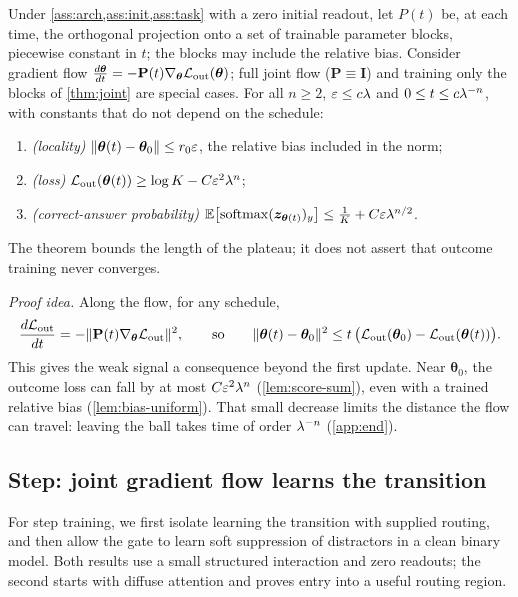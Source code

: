 \begin{theorem}
\label{thm:outcome-end}
Under \cref{ass:arch,ass:init,ass:task} with a zero initial readout, let $P(t)$ be, at each time, the orthogonal projection onto a set
of trainable parameter blocks, piecewise constant in $t$; the blocks may include the relative bias. Consider gradient flow
$\tfrac{d\bm\theta}{dt}=-\mathbf P(t)\nabla_{\bm\theta}\Lout(\bm\theta)$; full joint flow ($\mathbf P\equiv\mathbf I$) and training only the blocks of \cref{thm:joint} are special cases.
For all $n\ge2$, $\varepsilon\le c\lambda$ and $0\le t\le c\lambda^{-n}$, with constants that do not depend on the schedule:
\begin{enumerate}[label=(\roman*),leftmargin=*,itemsep=0pt,topsep=2pt]
\item \emph{(locality)} $\|\bm\theta(t)-\bm\theta_0\|\le r_0\varepsilon$, the relative bias included in the norm;
\item \emph{(loss)} $\mathcal L_{\mathrm{out}}(\bm\theta(t))\ge\log K-C\varepsilon^2\lambda^n$;
\item \emph{(correct-answer probability)} $\mathbb E\bigl[\operatorname{softmax}(\bm z_{\bm\theta(t)})_y\bigr]\le\frac{1}{K}+C\varepsilon\lambda^{n/2}$.
\end{enumerate}
\end{theorem}
The theorem bounds the length of the plateau; it does not assert that outcome training never converges.

\emph{Proof idea.} Along the flow, for any schedule,
\[
 \frac{d\mathcal L_{\mathrm{out}}}{dt}=-\|\mathbf P(t)\nabla_{\bm\theta}\mathcal L_{\mathrm{out}}\|^2,
 \qquad\text{so}\qquad
 \|\bm\theta(t)-\bm\theta_0\|^2\le t\,\bigl(\mathcal L_{\mathrm{out}}(\bm\theta_0)-\mathcal L_{\mathrm{out}}(\bm\theta(t))\bigr).
\]
This gives the weak signal a consequence beyond the first update. Near $\bm\theta_0$, the outcome loss can fall by at most
$C\varepsilon^2\lambda^n$ (\cref{lem:score-sum}), even with a trained relative bias (\cref{lem:bias-uniform}). That small decrease limits
the distance the flow can travel: leaving the ball takes time of order $\lambda^{-n}$ (\cref{app:end}).

\subsection{Step: joint gradient flow learns the transition}
\label{sec:step}
For step training, we first isolate learning the transition with supplied routing, and then allow the gate to learn
soft suppression of distractors in a clean binary model. Both results use a small structured interaction and zero readouts;
the second starts with diffuse attention and proves entry into a useful routing region.

